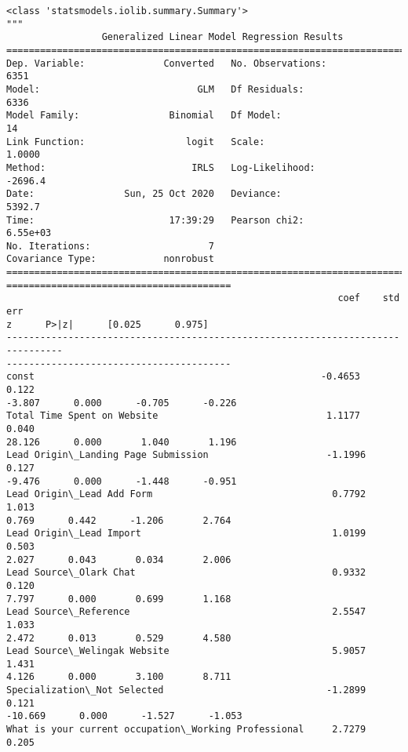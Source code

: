 \documentclass[11pt]{article}
\makeatletter
\newcommand{\boxspacing}{\kern\kvtcb@left@rule\kern\kvtcb@boxsep}
\newcommand{\prompt}[4]{
        \ttfamily\llap{{\color{#2}[#3]:\hspace{3pt}#4}}\vspace{-\baselineskip}
    }
\makeatother
\begin{document}
            \begin{tcolorbox}[breakable, size=fbox, boxrule=.5pt, pad at break*=1mm, opacityfill=0]
\prompt{Out}{outcolor}{79}{\boxspacing}
\begin{Verbatim}[commandchars=\\\{\}]
<class 'statsmodels.iolib.summary.Summary'>
"""
                 Generalized Linear Model Regression Results
==============================================================================
Dep. Variable:              Converted   No. Observations:                 6351
Model:                            GLM   Df Residuals:                     6336
Model Family:                Binomial   Df Model:                           14
Link Function:                  logit   Scale:                          1.0000
Method:                          IRLS   Log-Likelihood:                -2696.4
Date:                Sun, 25 Oct 2020   Deviance:                       5392.7
Time:                        17:39:29   Pearson chi2:                 6.55e+03
No. Iterations:                     7
Covariance Type:            nonrobust
================================================================================
========================================
                                                           coef    std err
z      P>|z|      [0.025      0.975]
--------------------------------------------------------------------------------
----------------------------------------
const                                                   -0.4653      0.122
-3.807      0.000      -0.705      -0.226
Total Time Spent on Website                              1.1177      0.040
28.126      0.000       1.040       1.196
Lead Origin\_Landing Page Submission                     -1.1996      0.127
-9.476      0.000      -1.448      -0.951
Lead Origin\_Lead Add Form                                0.7792      1.013
0.769      0.442      -1.206       2.764
Lead Origin\_Lead Import                                  1.0199      0.503
2.027      0.043       0.034       2.006
Lead Source\_Olark Chat                                   0.9332      0.120
7.797      0.000       0.699       1.168
Lead Source\_Reference                                    2.5547      1.033
2.472      0.013       0.529       4.580
Lead Source\_Welingak Website                             5.9057      1.431
4.126      0.000       3.100       8.711
Specialization\_Not Selected                             -1.2899      0.121
-10.669      0.000      -1.527      -1.053
What is your current occupation\_Working Professional     2.7279      0.205

\end{Verbatim}
\end{tcolorbox}
\end{document}
